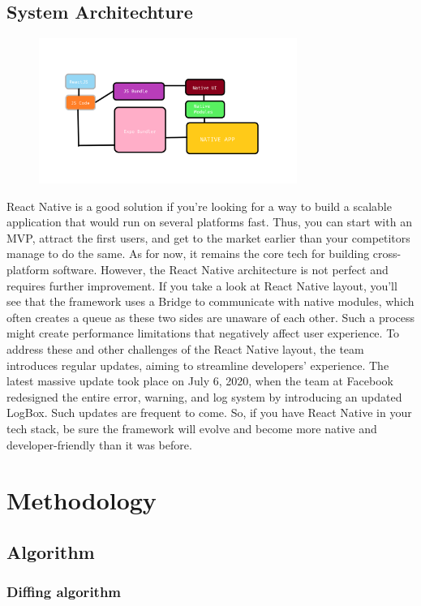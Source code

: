 \documentclass[12pt,a4paper]{report}
\begin{document}
\section{System Architechture}
\begin{figure}[h]
    \centering
    \includegraphics[width=0.75\textwidth]{arch}
\end{figure}
 React Native is a good solution if you’re looking for a way to build a scalable application that would run on several platforms fast. Thus, you can start with an MVP, attract the first users, and get to the market earlier than your competitors manage to do the same. As for now, it remains the core tech for building cross-platform software. However, the React Native architecture is not perfect and requires further improvement. If you take a look at React Native layout, you’ll see that the framework uses a Bridge to communicate with native modules, which often creates a queue as these two sides are unaware of each other. Such a process might create performance limitations that negatively affect user experience. To address these and other challenges of the React Native layout, the team introduces regular updates, aiming to streamline developers’ experience. The latest massive update took place on July 6, 2020, when the team at Facebook redesigned the entire error, warning, and log system by introducing an updated LogBox. Such updates are frequent to come. So, if you have React Native in your tech stack, be sure the framework will evolve and become more native and developer-friendly than it was before.

\newpage

\chapter{Methodology}
\section{Algorithm}
\subsection{Diffing algorithm}
\end{document}
